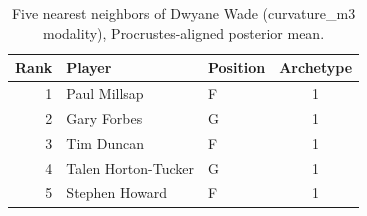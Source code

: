 \begin{table}[htbp]
  \centering\small
  \begin{tabular}{rllc}
    \toprule
    Rank & Player & Position & Archetype \\
    \midrule
    1 & Paul Millsap & F & 1 \\
    2 & Gary Forbes & G & 1 \\
    3 & Tim Duncan & F & 1 \\
    4 & Talen Horton-Tucker & G & 1 \\
    5 & Stephen Howard & F & 1 \\
    \bottomrule
  \end{tabular}
  \caption{Five nearest neighbors of Dwyane Wade (curvature_m3 modality), Procrustes-aligned posterior mean.}
  \label{tab:Dwyane_Wade_neighbors_curvature_m3}
\end{table}

